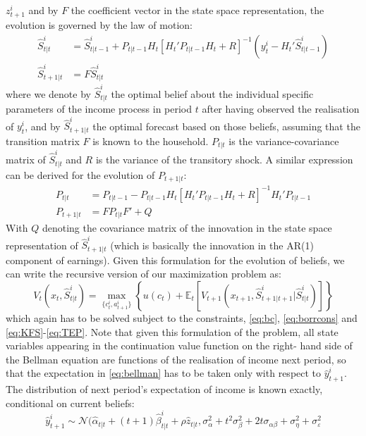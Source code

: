 $z^i_{t+1}$ and by $F$ the coefficient vector in the state space representation,
the evolution is governed by the law of motion:
\begin{align}
\hat{S}^i_{t|t} &= \hat{S}^i_{t|t-1} + P_{t|t-1} H_t [H_t' P_{t|t-1} H_t + R]^{-1}(y_t^i - H_t' \hat{S}^i_{t|t-1}) \label{eq:KFS} \\
\hat{S}^i_{t+1|t} &= F \hat{S}^i_{t|t} \label{eq:TES}
\end{align}
where we denote by $\hat{S}^i_{t|t}$ the optimal belief about the individual specific
parameters of the income process in period $t$ after having observed the realisation
of $y_t^i$, and by $\hat{S}^i_{t+1|t}$ the optimal forecast based on those beliefs,
assuming that the transition matrix $F$ is known to the household. $P_{t|t}$ is 
the variance-covariance matrix of $\hat{S}^i_{t|t}$ and $R$  is the variance of 
the transitory shock. A similar expression can be derived for the evolution of 
$P_{t+1|t}$:
\begin{align}
P_{t|t} &= P_{t|t-1} - P_{t|t-1} H_t [ H_t' P_{t|t-1} H_t + R]^{-1} H_t' P_{t|t-1} \label{eq:KFP} \\
P_{t+1|t} &= F P_{t|t} F' + Q \label{eq:TEP}
\end{align}
With $Q$ denoting the covariance matrix of the innovation in the state space 
representation of $\hat{S}_{t+1|t}^i$ (which is basically the innovation in the 
AR(1) component of earnings). 
Given this formulation for the evolution of beliefs, we can write the recursive 
version of our maximization problem as:
\begin{equation} \label{eq:bellman}
V_t(x_t,\hat{S}^i_{t|t}) = \max_{\{c_t^i, a_{t+1}^i\}} \left\{ u(c_t) + \mathbb{E}_t \left[ V_{t+1}(x_{t+1},\hat{S}^i_{t+1|t+1}|\hat{S}^i_{t|t}) \right] \right\}
\end{equation}
which again has to be solved subject to the constraints, \ref{eq:bc}, \ref{eq:borrcons} 
and \ref{eq:KFS}-\ref{eq:TEP}. Note that given this formulation of the problem, 
all state variables appearing in the continuation value function on the right-
hand side of the Bellman equation are functions of the realisation of income 
next period, so that the expectation in \ref{eq:bellman} has to be taken only 
with respect to $\hat{y}^i_{t+1}$. The distribution of next period's expectation
of income is known exactly, conditional on current beliefs:
$$ 
\hat{y}^i_{t+1} \sim \mathcal{N}(\hat{\alpha}_{t|t} + (t+1)\hat{\beta}^i_{t|t} + \rho \hat{z}_{t|t}, \sigma^2_{\alpha} + t^2 \sigma^2_{\beta} + 2t\sigma_{\alpha \beta} + \sigma^2_{\eta} + \sigma^2_{\varepsilon}
$$
